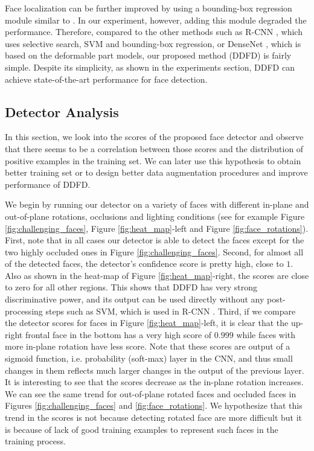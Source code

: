 \documentclass{sig-alternate-2013}
\begin{document}
 Face localization can be further improved by using a bounding-box regression module similar to \cite{overfeat, rcnn}. In our experiment, however, adding this module degraded the performance. Therefore, compared to the other methods such as R-CNN \cite{rcnn}, which uses selective search, SVM and bounding-box regression, or DenseNet \cite{dense_net_dpm}, which is based on the deformable part models, our proposed method (DDFD) is fairly simple. Despite its simplicity, as shown in the experiments section, DDFD can achieve state-of-the-art performance for face detection.

\subsection{Detector Analysis}
        
In this section, we look into the scores of the proposed face detector and observe that
there seems to be a correlation between those scores and the distribution of positive examples in the training set. We can later use this hypothesis to obtain better training set or to design better data augmentation procedures and improve performance of DDFD.

We begin by running our detector on a variety of faces with different in-plane and out-of-plane rotations, occlusions and lighting conditions (see for example  Figure \ref{fig:challenging_faces}, Figure \ref{fig:heat_map}-left and Figure \ref{fig:face_rotations}). First, note that in all cases our detector is able to detect the faces except for the two highly occluded ones in Figure \ref{fig:challenging_faces}. Second, for almost all of the detected faces, the detector's confidence score is pretty high, close to $1$. Also as shown in the heat-map of Figure \ref{fig:heat_map}-right, the scores are close to zero for all other regions. This shows that DDFD has very strong discriminative power, and its output can be used directly without any post-processing steps such as SVM, which is used in R-CNN \cite{rcnn}. Third, if we compare the detector scores for faces in Figure \ref{fig:heat_map}-left, it is clear that the up-right frontal face in the bottom has a very high score of $0.999$ while faces with more in-plane rotation have less score. Note that these scores are output of a sigmoid function, i.e. probability (soft-max) layer in the CNN, and thus small changes in them reflects much larger changes in the output of the previous layer. It is interesting to see that the scores decrease as the in-plane rotation increases. We can see the same trend for out-of-plane rotated faces and occluded faces in Figures \ref{fig:challenging_faces} and \ref{fig:face_rotations}. We hypothesize that this trend in the scores is not because detecting rotated face are more difficult but it is because of lack of good training examples to represent such faces in the training process.
\end{document}
